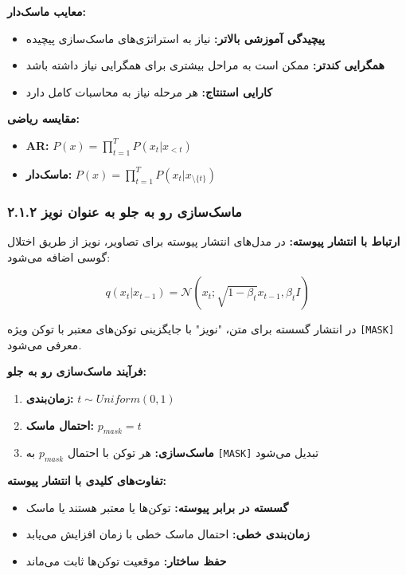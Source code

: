 \documentclass[12pt,a4paper]{article}
\theoremstyle{definition}
\begin{document}
\textbf{معایب ماسک‌دار:}
\begin{itemize}
    \item \textbf{پیچیدگی آموزشی بالاتر:} نیاز به استراتژی‌های ماسک‌سازی پیچیده
    \item \textbf{همگرایی کندتر:} ممکن است به مراحل بیشتری برای همگرایی نیاز داشته باشد
    \item \textbf{کارایی استنتاج:} هر مرحله نیاز به محاسبات کامل دارد
\end{itemize}

\textbf{مقایسه ریاضی:}
\begin{itemize}
    \item \textbf{AR:} $P(x) = \prod_{t=1}^T P(x_t | x_{<t})$
    \item \textbf{ماسک‌دار:} $P(x) = \prod_{t=1}^T P(x_t | x_{\setminus \{t\}})$
\end{itemize}

\subsubsection*{۲.۱.۲ ماسک‌سازی رو به جلو به عنوان نویز}

\textbf{ارتباط با انتشار پیوسته:}
در مدل‌های انتشار پیوسته برای تصاویر، نویز از طریق اختلال گوسی اضافه می‌شود:

\begin{equation}
q(x_t | x_{t-1}) = \mathcal{N}(x_t; \sqrt{1-\beta_t} x_{t-1}, \beta_t I)
\end{equation}

در انتشار گسسته برای متن، "نویز" با جایگزینی توکن‌های معتبر با توکن ویژه \texttt{[MASK]} معرفی می‌شود.

\textbf{فرآیند ماسک‌سازی رو به جلو:}
\begin{enumerate}
    \item \textbf{زمان‌بندی:} $t \sim Uniform(0, 1)$
    \item \textbf{احتمال ماسک:} $p_{mask} = t$
    \item \textbf{ماسک‌سازی:} هر توکن با احتمال $p_{mask}$ به \texttt{[MASK]} تبدیل می‌شود
\end{enumerate}

\textbf{تفاوت‌های کلیدی با انتشار پیوسته:}
\begin{itemize}
    \item \textbf{گسسته در برابر پیوسته:} توکن‌ها یا معتبر هستند یا ماسک
    \item \textbf{زمان‌بندی خطی:} احتمال ماسک خطی با زمان افزایش می‌یابد
    \item \textbf{حفظ ساختار:} موقعیت توکن‌ها ثابت می‌ماند
\end{itemize}
\end{document}
